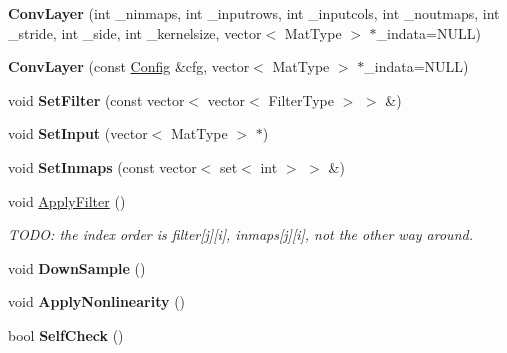 \begin{DoxyCompactItemize}
\item 
\hypertarget{class_conv_layer_a7516441d146b575d8ba191278fe8ba9d}{{\bfseries Conv\+Layer} (int \+\_\+ninmaps, int \+\_\+inputrows, int \+\_\+inputcols, int \+\_\+noutmaps, int \+\_\+stride, int \+\_\+side, int \+\_\+kernelsize, vector$<$ Mat\+Type $>$ $\ast$\+\_\+indata=N\+U\+L\+L)}\label{class_conv_layer_a7516441d146b575d8ba191278fe8ba9d}

\item 
\hypertarget{class_conv_layer_a6a591fe184f7a69d38a6ec0f0e681af5}{{\bfseries Conv\+Layer} (const \hyperlink{struct_config}{Config} \&cfg, vector$<$ Mat\+Type $>$ $\ast$\+\_\+indata=N\+U\+L\+L)}\label{class_conv_layer_a6a591fe184f7a69d38a6ec0f0e681af5}

\item 
\hypertarget{class_conv_layer_ad7b04710a903116d88fcc017b2ca4f2f}{void {\bfseries Set\+Filter} (const vector$<$ vector$<$ Filter\+Type $>$ $>$ \&)}\label{class_conv_layer_ad7b04710a903116d88fcc017b2ca4f2f}

\item 
\hypertarget{class_conv_layer_a585102c25508332b6ab2799409393204}{void {\bfseries Set\+Input} (vector$<$ Mat\+Type $>$ $\ast$)}\label{class_conv_layer_a585102c25508332b6ab2799409393204}

\item 
\hypertarget{class_conv_layer_a8bb67f36834497242e12d0eea4ece95a}{void {\bfseries Set\+Inmaps} (const vector$<$ set$<$ int $>$ $>$ \&)}\label{class_conv_layer_a8bb67f36834497242e12d0eea4ece95a}

\item 
\hypertarget{class_conv_layer_a70111098046a07416fcbdffdbe8f0cfd}{void \hyperlink{class_conv_layer_a70111098046a07416fcbdffdbe8f0cfd}{Apply\+Filter} ()}\label{class_conv_layer_a70111098046a07416fcbdffdbe8f0cfd}

\begin{DoxyCompactList}\small\item\em T\+O\+D\+O\+: the index order is filter\mbox{[}j\mbox{]}\mbox{[}i\mbox{]}, inmaps\mbox{[}j\mbox{]}\mbox{[}i\mbox{]}, not the other way around. \end{DoxyCompactList}\item 
\hypertarget{class_conv_layer_a8970249425ba935d91bc0f0a530ea13c}{void {\bfseries Down\+Sample} ()}\label{class_conv_layer_a8970249425ba935d91bc0f0a530ea13c}

\item 
\hypertarget{class_conv_layer_a5e5a5da58cb21ca2894ecf55088a2636}{void {\bfseries Apply\+Nonlinearity} ()}\label{class_conv_layer_a5e5a5da58cb21ca2894ecf55088a2636}

\item 
\hypertarget{class_conv_layer_aea08727ba47d3c813e309cc278860bbd}{bool {\bfseries Self\+Check} ()}\label{class_conv_layer_aea08727ba47d3c813e309cc278860bbd}

\end{DoxyCompactItemize}
